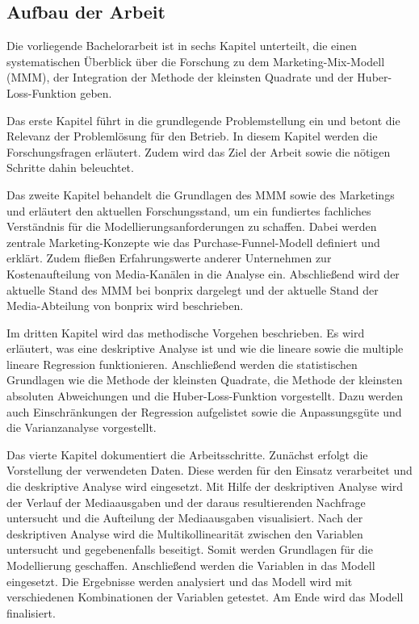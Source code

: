 \subsection{Aufbau der Arbeit}
Die vorliegende Bachelorarbeit ist in sechs Kapitel unterteilt, die einen systematischen Überblick über die Forschung zu dem Marketing-Mix-Modell (\ac{MMM}), der Integration der Methode der kleinsten Quadrate und der Huber-Loss-Funktion geben.\par 
Das erste Kapitel  führt in die grundlegende Problemstellung ein und betont die Relevanz der Problemlösung für den Betrieb. In diesem Kapitel werden die Forschungsfragen erläutert. Zudem wird das Ziel der Arbeit sowie die nötigen Schritte dahin beleuchtet. \par
Das zweite Kapitel  behandelt die Grundlagen des \ac{MMM} sowie des Marketings und erläutert den aktuellen Forschungsstand, um ein fundiertes fachliches Verständnis für die Modellierungsanforderungen zu schaffen. Dabei werden zentrale Marketing-Konzepte wie das Purchase-Funnel-Modell definiert und erklärt. Zudem fließen Erfahrungswerte anderer Unternehmen zur Kostenaufteilung von Media-Kanälen in die Analyse ein. Abschließend wird der aktuelle Stand des \ac{MMM} bei bonprix dargelegt und der aktuelle Stand der Media-Abteilung von bonprix wird beschrieben.\par 
Im dritten Kapitel  wird das methodische Vorgehen beschrieben. Es wird erläutert, was eine deskriptive Analyse ist und wie die lineare sowie die multiple lineare Regression funktionieren. Anschließend werden die statistischen Grundlagen wie die Methode der kleinsten Quadrate, die Methode der kleinsten absoluten Abweichungen und die Huber-Loss-Funktion vorgestellt. Dazu werden auch Einschränkungen der Regression aufgelistet sowie die Anpassungsgüte und die Varianzanalyse vorgestellt. \par
Das vierte Kapitel  dokumentiert die Arbeitsschritte. Zunächst erfolgt die Vorstellung der verwendeten Daten. Diese werden für den Einsatz verarbeitet und die deskriptive Analyse wird eingesetzt. Mit Hilfe der deskriptiven Analyse wird der Verlauf der Mediaausgaben und der daraus resultierenden Nachfrage untersucht und die Aufteilung der Mediaausgaben visualisiert. Nach der deskriptiven Analyse wird die Multikollinearität zwischen den Variablen untersucht und gegebenenfalls beseitigt. Somit werden Grundlagen für die Modellierung geschaffen. Anschließend werden die Variablen in das Modell eingesetzt. Die Ergebnisse werden analysiert und das Modell wird mit verschiedenen Kombinationen der Variablen getestet. Am Ende wird das Modell finalisiert. \par
